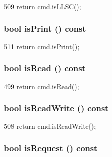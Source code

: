 \begin{DoxyCode}
509 { return cmd.isLLSC(); }
\end{DoxyCode}
\hypertarget{classPacket_ae56bb417ddf53e85cb389267590fe969}{
\subsubsection[{isPrint}]{\setlength{\rightskip}{0pt plus 5cm}bool isPrint () const}}
\label{classPacket_ae56bb417ddf53e85cb389267590fe969}



\begin{DoxyCode}
511 { return cmd.isPrint(); }
\end{DoxyCode}
\hypertarget{classPacket_adc47901747fc3c447db3abddaf01491a}{
\subsubsection[{isRead}]{\setlength{\rightskip}{0pt plus 5cm}bool isRead () const}}
\label{classPacket_adc47901747fc3c447db3abddaf01491a}



\begin{DoxyCode}
499 { return cmd.isRead(); }
\end{DoxyCode}
\hypertarget{classPacket_aa05746eae63aee1fb4758c13d0301a9f}{
\subsubsection[{isReadWrite}]{\setlength{\rightskip}{0pt plus 5cm}bool isReadWrite () const}}
\label{classPacket_aa05746eae63aee1fb4758c13d0301a9f}



\begin{DoxyCode}
508 { return cmd.isReadWrite(); }
\end{DoxyCode}
\hypertarget{classPacket_af21986d725d75fa8e1b6c83457cd4501}{
\subsubsection[{isRequest}]{\setlength{\rightskip}{0pt plus 5cm}bool isRequest () const}}
\label{classPacket_af21986d725d75fa8e1b6c83457cd4501}



